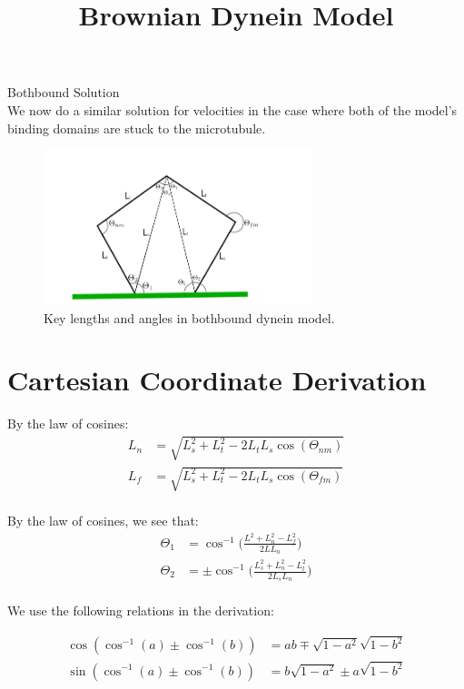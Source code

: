 \documentclass[11pt, landscape]{article}
\title{Brownian Dynein Model}
\begin{document}
\maketitle

{\huge Bothbound Solution} \\
We now do a similar solution for velocities in the case where both of the model's binding domains are stuck to the microtubule.

\begin{figure}[h!]
  \caption{Key lengths and angles in bothbound dynein model.}
  \centering
    \includegraphics[width=0.7\textwidth]{../figures/bothbound_model.png}
\end{figure}

\section{Cartesian Coordinate Derivation}

By the law of cosines:
\begin{align}
  L_n &= \sqrt{L_{s}^2+L_{t}^2-2L_{t}L_{s}\cos(\Theta_{nm})}\\
  L_f &= \sqrt{L_{s}^2+L_{t}^2-2L_{t}L_{s}\cos(\Theta_{fm})}\\
\end{align}

By the law of cosines, we see that:
\begin{align}
  \Theta_{1} &= \cos^{-1}\bigg(\frac{L^2+L_{n}^2-L_{f}^2}{2LL_{n}}\bigg) \\
  \Theta_{2} &= \pm\cos^{-1}\bigg(\frac{L_{s}^2+L_{n}^2-L_{t}^2}{2L_{s}L_{n}}\bigg) \\
\end{align}

We use the following relations in the derivation:

\begin{align}
  \cos(\cos^{-1}(a) \pm \cos^{-1}(b)) &= ab \mp \sqrt{1-a^2}\sqrt{1-b^2}\\
  \sin(\cos^{-1}(a) \pm \cos^{-1}(b)) &= b\sqrt{1-a^2} \pm a\sqrt{1-b^2}\\
\end{align}
\end{document}
